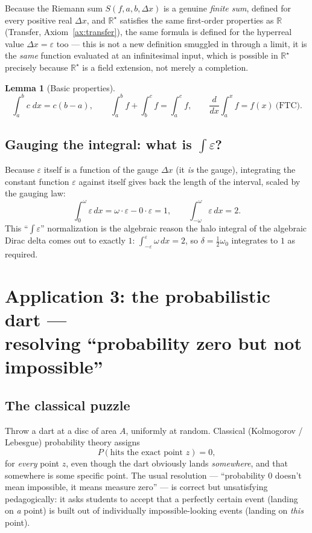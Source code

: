\documentclass[11pt]{article}
\newtheorem{lemma}[theorem]{Lemma}
\theoremstyle{definition}
\theoremstyle{remark}
\newcommand{\R}{\mathbb{R}}
\newcommand{\Rstar}{\mathbb{R}^{\star}}
\newcommand{\eps}{\varepsilon}
\begin{document}
Because the Riemann sum $S(f,a,b,\Delta x)$ is a genuine \emph{finite
sum}, defined for every positive real $\Delta x$, and $\Rstar$ satisfies
the same first-order properties as $\R$ (Transfer, Axiom~\ref{ax:transfer}),
the same formula is defined for the hyperreal value $\Delta x = \eps$
too — this is not a new definition smuggled in through a limit, it is the
\emph{same} function evaluated at an infinitesimal input, which is
possible in $\Rstar$ precisely because $\Rstar$ is a field extension, not
merely a completion.

\begin{lemma}[Basic properties]\label{lem:integral-basics}
\[
\int_a^b c \;dx = c(b-a), \qquad
\int_a^b f + \int_b^c f = \int_a^c f, \qquad
\frac{d}{dx}\int_a^x f = f(x)\ \text{(FTC)}.
\]
\end{lemma}

\subsection{Gauging the integral: what is $\int \eps$?}

Because $\eps$ itself is a function of the gauge $\Delta x$ (it \emph{is}
the gauge), integrating the constant function $\eps$ against itself gives
back the length of the interval, scaled by the gauging law:
\[
\int_0^\omega \eps \,dx = \omega\cdot\eps - 0\cdot\eps = 1,
\qquad
\int_{-\omega}^{\omega}\eps\,dx = 2.
\]
This ``$\int \eps$'' normalization is the algebraic reason the halo
integral of the algebraic Dirac delta comes out to exactly $1$:
$\int_{-\eps}^{\eps}\omega\,dx = 2$, so $\delta=\tfrac12\omega_0$ integrates
to $1$ as required.

\section{Application 3: the probabilistic dart —\\ resolving ``probability zero but not impossible''}

\subsection{The classical puzzle}

Throw a dart at a disc of area $A$, uniformly at random. Classical
(Kolmogorov / Lebesgue) probability theory assigns
\[
P(\text{hits the exact point } z) = 0,
\]
for \emph{every} point $z$, even though the dart obviously lands
\emph{somewhere}, and that somewhere is some specific point. The usual
resolution — ``probability $0$ doesn't mean impossible, it means measure
zero'' — is correct but unsatisfying pedagogically: it asks students to
accept that a perfectly certain event (landing on \emph{a} point) is built
out of individually impossible-looking events (landing on \emph{this}
point).
\end{document}
